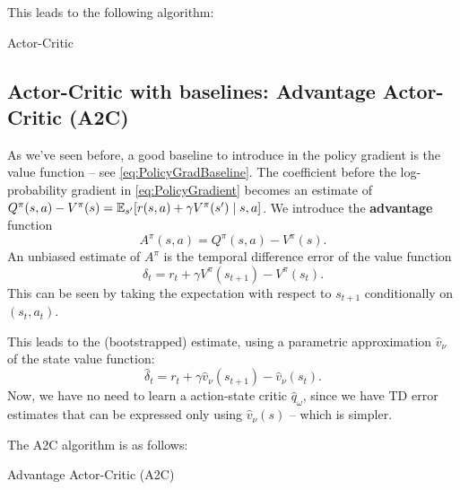 \documentclass[../course-notes.tex]{subfiles}
\begin{document}
This leads to the following algorithm:

\begin{algorithm}[H]
	\caption{Actor-Critic}\label{algo:BaseActorCritic}
\end{algorithm}



\subsection{Actor-Critic with baselines: Advantage Actor-Critic (A2C)}

As we've seen before, a good baseline to introduce in the policy gradient is the value function -- see \cref{eq:PolicyGradBaseline}.
The coefficient before the log-probability gradient in \eqref{eq:PolicyGradient} becomes an estimate of $Q^\pi(s,a) - V^\pi(s) = \operatorname{\mathbb{E}}_{s'}[r(s,a) + \gamma V^\pi(s')\mid s,a]$. We introduce the \textbf{advantage} function
\begin{equation}\label{eq:AdvantageDefn}
A^\pi(s,a) = Q^\pi(s,a) - V^\pi(s).
\end{equation}
An unbiased estimate of $A^\pi$ is the temporal difference error of the value function
\[
\delta_t = r_t + \gamma V^\pi(s_{t+1}) - V^\pi(s_t).
\]
This can be seen by taking the expectation with respect to $s_{t+1}$ conditionally on $(s_t,a_t)$.

This leads to the (bootstrapped) estimate, using a parametric approximation $\widehat{v}_\nu$ of the state value function:
\[
	\widehat{\delta}_t = r_t + \gamma\widehat{v}_\nu(s_{t+1}) - \widehat{v}_\nu(s_t).
\]
Now, we have no need to learn a action-state critic $\widehat{q}_\omega$, since we have TD error estimates that can be expressed only using $\widehat{v}_\nu(s)$ -- which is simpler.

The A2C algorithm is as follows:

\begin{algorithm}[H]
	\caption{Advantage Actor-Critic (A2C)}\label{algo:AdvantageActorCritic}
\end{algorithm}
\end{document}
